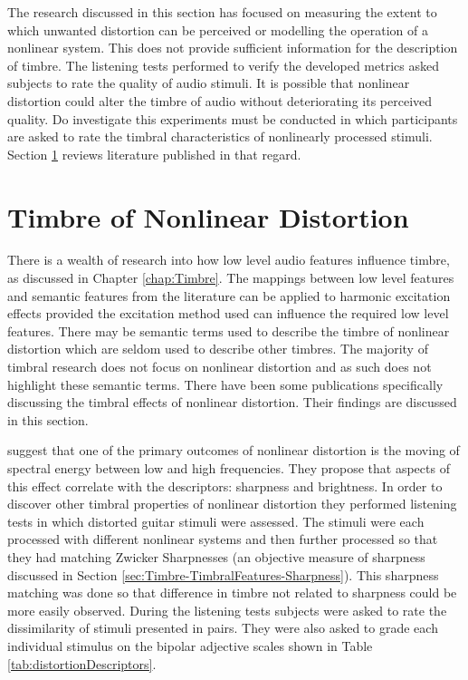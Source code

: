 			The research discussed in this section has focused on measuring the extent to which unwanted
			distortion can be perceived or modelling the operation of a nonlinear system. This does not provide
			sufficient information for the description of timbre. The listening tests performed to verify the
			developed metrics asked subjects to rate the quality of audio stimuli. It is possible that nonlinear
			distortion could alter the timbre of audio without deteriorating its perceived quality. Do
			investigate this experiments must be conducted in which participants are asked to rate the timbral
			characteristics of nonlinearly processed stimuli. Section \ref{sec:Excitation-Timbre} reviews
			literature published in that regard.

\section{Timbre of Nonlinear Distortion}
\label{sec:Excitation-Timbre}

	There is a wealth of research into how low level audio features influence timbre, as discussed in Chapter
	\ref{chap:Timbre}. The mappings between low level features and semantic features from the literature can be applied
	to harmonic excitation effects provided the excitation method used can influence the required low level features.
	There may be semantic terms used to describe the timbre of nonlinear distortion which are seldom used to describe
	other timbres. The majority of timbral research does not focus on nonlinear distortion and as such does not
	highlight these semantic terms. There have been some publications specifically discussing the timbral effects of
	nonlinear distortion. Their findings are discussed in this section.

	\citet{marui2005predicting} suggest that one of the primary outcomes of nonlinear distortion is the moving of
	spectral energy between low and high frequencies. They propose that aspects of this effect correlate with the
	descriptors: sharpness and brightness. In order to discover other timbral properties of nonlinear distortion they
	performed listening tests in which distorted guitar stimuli were assessed. The stimuli were each processed with
	different nonlinear systems and then further processed so that they had matching Zwicker Sharpnesses (an objective
	measure of sharpness \citep{fastl2007psychoacoustics} discussed in Section
	\ref{sec:Timbre-TimbralFeatures-Sharpness}). This sharpness matching was done so that difference in timbre not
	related to sharpness could be more easily observed. During the listening tests subjects were asked to rate the
	dissimilarity of stimuli presented in pairs. They were also asked to grade each individual stimulus on the bipolar
	adjective scales shown in Table \ref{tab:distortionDescriptors}.

